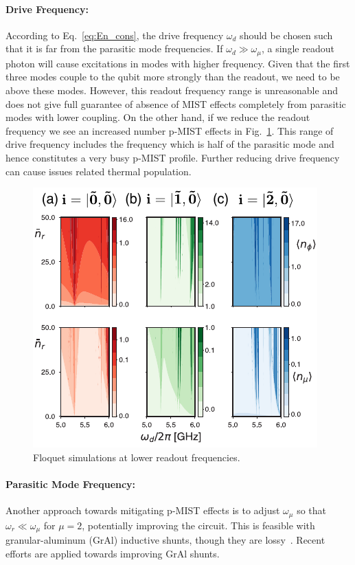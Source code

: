 \documentclass[%
reprint,
superscriptaddress,
 amsmath,amssymb,
 aps,
 prx,
longbibliography,
floatfix,
]{revtex4-2}
\begin{document}
\paragraph{Drive Frequency:} 
According to Eq.~\ref{eq:En_cons}, the drive frequency $\omega_d$ should be chosen such that it is far from the parasitic mode frequencies. If $\omega_d\gg \omega_\mu$, a single readout photon will cause excitations in modes with higher frequency. Given that the first three modes couple to the qubit more strongly than the readout, we need to be above these modes. However, this readout frequency range is unreasonable and does not give full guarantee of absence of MIST effects completely from parasitic modes with lower coupling. On the other hand, if we reduce the readout frequency we see an increased number p-MIST effects in Fig.~\ref{fig:Flo_low}. This range of drive frequency includes the frequency which is half of the parasitic mode and hence constitutes a very busy p-MIST profile. Further reducing drive frequency can cause issues related thermal population.

\begin{figure}[htb]
    \centering
    \includegraphics[width=\linewidth]{Figures/Floquet_low.pdf}
    \caption{Floquet simulations at lower readout frequencies.}
    \label{fig:Flo_low}
\end{figure}

\paragraph{Parasitic Mode Frequency:}
Another approach towards mitigating p-MIST effects is to adjust  $\omega_\mu$  so that  $\omega_r \ll \omega_\mu$ for $\mu=2$, potentially improving the circuit. This is feasible with granular-aluminum (GrAl) inductive shunts, though they are lossy~\cite{gusenkova2021quantum}. Recent efforts are applied towards improving GrAl shunts. 
\end{document}
